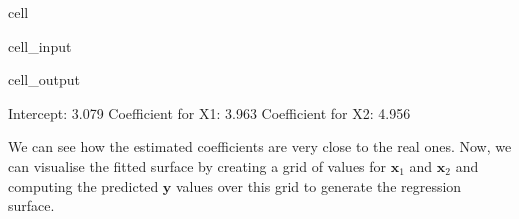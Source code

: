 \documentclass[letterpaper,10pt,english]{jupyterBook}
\begin{document}
\begin{sphinxuseclass}{cell}\begin{sphinxVerbatimInput}

\begin{sphinxuseclass}{cell_input}
\begin{sphinxVerbatim}[commandchars=\\\{\}]
        

\PYG{p}{[}\PYG{p}{]}\PYG{p}{[}\PYG{p}{]}
\PYG{p}{[}\PYG{p}{]}\PYG{p}{[}\PYG{p}{]}
\PYG{p}{[}\PYG{p}{]}\PYG{p}{[}\PYG{p}{]}
\end{sphinxVerbatim}

\end{sphinxuseclass}\end{sphinxVerbatimInput}
\begin{sphinxVerbatimOutput}

\begin{sphinxuseclass}{cell_output}
\begin{sphinxVerbatim}[commandchars=\\\{\}]
Intercept: 3.079
Coefficient for X1: 3.963
Coefficient for X2: 4.956
\end{sphinxVerbatim}

\end{sphinxuseclass}\end{sphinxVerbatimOutput}

\end{sphinxuseclass}
\sphinxAtStartPar
We can see how the estimated coefficients are very close to the real ones. Now, we can visualise the fitted surface by creating a grid of values for \(\mathbf{x}_1\) and \(\mathbf{x}_2\) and computing the predicted \(\mathbf{y}\) values over this grid to generate the regression surface.
\end{document}

